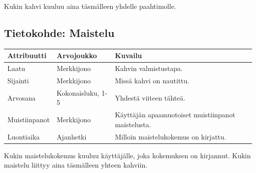 \documentclass[a4paper,titlepage]{article}
\begin{document}
Kukin kahvi kuuluu aina täsmälleen yhdelle paahtimolle.

\subsection{Tietokohde: Maistelu}

\begin{center}
\begin{tabularx}{\textwidth}{ |X|X|X| }
\hline
Attribuutti & Arvojoukko & Kuvailu \\
\hline
Laatu & Merkkijono & Kahvin valmistustapa. \\
Sijainti & Merkkijono & Missä kahvi on nautittu. \\
Arvosana & Kokonaisluku, 1-5 & Yhdestä viiteen tähteä. \\
Muistiinpanot & Merkkijono & Käyttäjän apaamuotoiset muistiinpanot maistelusta. \\
Luontiaika & Ajanhetki & Milloin maistelukokemus on kirjattu. \\
\hline
\end{tabularx}
\end{center}

Kukin maistelukokemus kuuluu käyttäjälle, joka kokemuksen on
kirjannut. Kukin maistelu liittyy aina täsmälleen yhteen kahviin.
\end{document}
